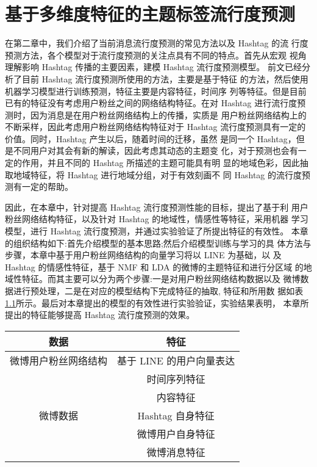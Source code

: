 \chapter{基于多维度特征的主题标签流行度预测}\label{chap:three}

在第二章中，我们介绍了当前消息流行度预测的常见方法以及 Hashtag 的流 行度预测方法，各个模型对于流行度预测的关注点具有不同的特点。首先从宏观 视角理解影响 Hashtag 传播的主要因素，建模 Hashtag 流行度预测模型。
前文已经分析了目前 Hashtag 流行度预测所使用的方法，主要是基于特征 的方法，然后使用机器学习模型进行训练预测，特征主要是内容特征，时间序 列等特征。但是目前已有的特征没有考虑用户粉丝之间的网络结构特征。在对 Hashtag 进行流行度预测时，因为消息是在用户粉丝网络结构上的传播，实质是 用户粉丝网络结构上的不断采样，因此考虑用户粉丝网络结构特征对于 Hashtag 流行度预测具有一定的价值。同时，Hashtag 产生以后，随着时间的迁移，虽然 是同一个 Hashtag，但是不同用户对其会有新的解读，因此考虑其动态的主题变 化，对于预测也会有一定的作用，并且不同的 Hashtag 所描述的主题可能具有明 显的地域色彩，因此抽取地域特征，将 Hashtag 进行地域分组，对于有效刻画不 同 Hashtag 的流行度预测有一定的帮助。

因此，在本章中，针对提高 Hashtag 流行度预测性能的目标，提出了基于利 用户粉丝网络结构特征，以及针对 Hashtag 的地域性，情感性等特征，采用机器 学习模型，进行 Hashtag 流行度预测，并通过实验验证了所提出特征的有效性。 本章的组织结构如下:首先介绍模型的基本思路;然后介绍模型训练与学习的具 体方法与步骤，本章中基于用户粉丝网络结构的向量学习将以 LINE 为基础，以 及 Hashtag 的情感性特征，基于 NMF 和 LDA 的微博的主题特征和进行分区域 的地域性特征。而其主要可以分为两个步骤:一是对用户粉丝网络结构数据以及 微博数据进行预处理，二是在对应的模型结构下完成特征的抽取, 特征和所用数 据如表\ref{tab:feature_data}所示。最后对本章提出的模型的有效性进行实验验证，实验结果表明， 本章所提出的特征能够提高 Hashtag 流行度预测的效果。

\begin{table}[!htbp]

    \label{tab:feature_data}
    \centering
    \footnotesize%
    \setlength{\tabcolsep}{20pt}%
    \renewcommand{\arraystretch}{1.2}%
    \begin{tabular}{cc}
        \hline
数据& 特征\\
        \hline
        \multirow{1}{*}{微博用户粉丝网络结构}& 基于 LINE 的用户向量表达 \\ \hline

\multirow{5}{*}{微博数据} &
时间序列特征 \\ &
内容特征\\&
Hashtag 自身特征 \\&
微博用户自身特征 \\&
微博消息特征\\
   
 \hline
    \end{tabular}
\end{table}



